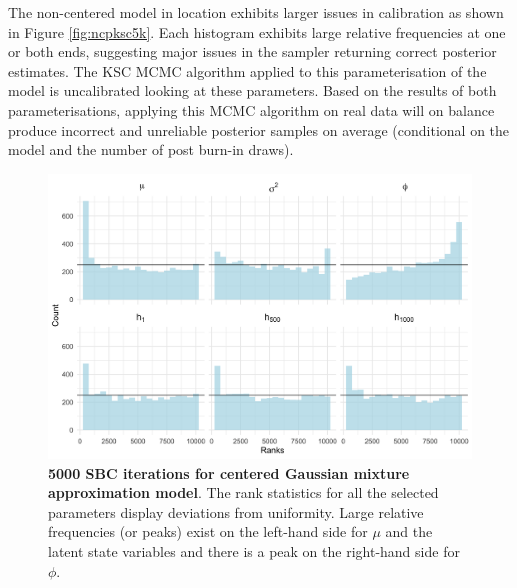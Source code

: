 \documentclass[12pt, a4paper]{article}
\begin{document}
    The non-centered model in location exhibits larger issues in calibration as shown in Figure \ref{fig:ncpksc5k}. Each histogram exhibits large relative frequencies at one or both ends, suggesting major issues in the sampler returning correct posterior estimates. The KSC MCMC algorithm applied to this parameterisation of the model is uncalibrated looking at these parameters. Based on the results of both parameterisations, applying this MCMC algorithm on real data will on balance produce incorrect and unreliable posterior samples on average (conditional on the model and the number of post burn-in draws).
    \begin{figure}[H]
        \centering
        \includegraphics[scale=0.09]{results/ksc_cp_5k.png}
        \caption{\textbf{5000 SBC iterations for centered Gaussian mixture approximation model}. The rank statistics for all the selected parameters display deviations from uniformity. Large relative frequencies (or peaks) exist on the left-hand side for $\mu$ and the latent state variables and there is a peak on the right-hand side for $\phi$.}
        \label{fig:cpksc5k}
    \end{figure}
\end{document}
